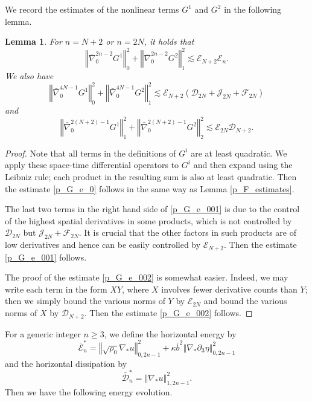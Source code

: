 \documentclass[a4paper,reqno,11pt]{amsart}
\numberwithin{equation}{section}
\providecommand{\norm}[1]{\left\Vert#1\right\Vert}
\providecommand{\sd}[1]{\mathcal{D}_{#1}}
\providecommand{\se}[1]{\mathcal{E}_{#1}}
\providecommand{\ns}[1]{\norm{#1}^2}
\providecommand{\norm}[1]{\left\Vert#1\right\Vert}
\newtheorem{lem}{Lemma}[section]
\begin{document}
We record the estimates of the nonlinear terms $G^1$ and $G^2$ in the following lemma.
\begin{lem}\label{p_G_estimates}
For $n=N+2$ or $n=2N$, it holds that
 \begin{equation}\label{p_G_e_0}
  \ns{ \bar{\nabla}_0^{2n-2} G^1}_{0}  +  \ns{ \bar{\nabla}_0^{2n-2}  G^2}_{1}    {\lesssim}  \se{N+2}\se{n} .
 \end{equation}
We also have
\begin{equation}\label{p_G_e_001}
\ns{ \bar{\nabla}_0^{ 4N-1} G^1}_{0} +  \ns{ \bar{\nabla}_0^{ 4N-1}  G^2}_{1}   {\lesssim}  \se{N+2}(\sd{2N}+\mathcal{J}_{2N}+ {\mathcal{F}_{2N}} )
\end{equation}
and
\begin{equation}\label{p_G_e_002}
\ns{ \bar{\nabla}_0^{ 2(N+2)-1} G^1}_{1} +  \ns{ \bar{\nabla}_0^{ 2(N+2)-1}  G^2}_{2}  {\lesssim} \se{2N}\sd{N+2} .
\end{equation}
\end{lem}
\begin{proof}
Note that all terms in the definitions of $G^i$ are at least quadratic. We apply these
space-time differential operators to $G^i$ and then expand using the Leibniz rule; each product in
the resulting sum is also at least quadratic. Then the estimate \eqref{p_G_e_0} follows in the same way as Lemma \ref{p_F_estimates}.

The last two terms in the right hand side of \eqref{p_G_e_001} is due to the control of the highest spatial derivatives in some products, which is not controlled by $\sd{2N}$ but $\mathcal{J}_{2N}+ {\mathcal{F}_{2N}}$. It is crucial that the other factors in such products are of low derivatives and hence can be easily controlled by $\se{N+2}$. Then the estimate \eqref{p_G_e_001} follows.

The proof of the estimate \eqref{p_G_e_002} is somewhat easier. Indeed, we may write each term in the form $X Y$, where $X$ involves fewer derivative counts than $Y$; then we simply bound the various norms of $Y$ by $ \se{2N} $ and bound the various norms of $X$ by $\sd{N+2}$. Then the estimate \eqref{p_G_e_002} follows.
\end{proof}

For a generic integer $n\ge 3$, we define the  horizontal energy by
\begin{equation}
 \bar{\mathcal{E}}^{\ast}_{n} =   \norm{\sqrt{\rho_0 }\nabla_\ast  u }_{0,2n-1}^2  + \kappa\bar b^2\norm{\nabla_\ast{\partial}_3  \eta }_{0,2n-1}^2
\end{equation}
and the horizontal dissipation by
\begin{equation}
 \bar{\mathcal{D}}_n^{\ast} = \norm{ \nabla_\ast  u }_{1,2n-1}^2 .
\end{equation}
Then we have the following energy evolution.
\end{document}
